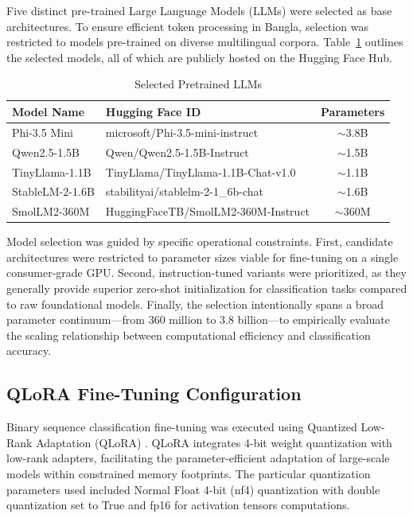 \documentclass[journal]{IEEEtran}
\begin{document}
Five distinct pre-trained Large Language Models (LLMs) were selected as base architectures. To ensure efficient token processing in Bangla, selection was restricted to models pre-trained on diverse multilingual corpora. Table~\ref{tab:models} outlines the selected models, all of which are publicly hosted on the Hugging Face Hub.

\begin{table}[htbp]
\caption{Selected Pretrained LLMs}
\label{tab:models}
\centering
\begin{tabular}{llc}
\toprule
\textbf{Model Name} & \textbf{Hugging Face ID} & \textbf{Parameters} \\
\midrule
Phi-3.5 Mini & microsoft/Phi-3.5-mini-instruct & $\sim$3.8B \\
Qwen2.5-1.5B & Qwen/Qwen2.5-1.5B-Instruct & $\sim$1.5B \\
TinyLlama-1.1B & TinyLlama/TinyLlama-1.1B-Chat-v1.0 & $\sim$1.1B \\
StableLM-2-1.6B & stabilityai/stablelm-2-1\_6b-chat & $\sim$1.6B \\
SmolLM2-360M & HuggingFaceTB/SmolLM2-360M-Instruct & $\sim$360M \\
\bottomrule
\end{tabular}
\end{table}

Model selection was guided by specific operational constraints. First, candidate architectures were restricted to parameter sizes viable for fine-tuning on a single consumer-grade GPU. Second, instruction-tuned variants were prioritized, as they generally provide superior zero-shot initialization for classification tasks compared to raw foundational models. Finally, the selection intentionally spans a broad parameter continuum---from 360 million to 3.8 billion---to empirically evaluate the scaling relationship between computational efficiency and classification accuracy.

\subsection{QLoRA Fine-Tuning Configuration}

Binary sequence classification fine-tuning was executed using Quantized Low-Rank Adaptation (QLoRA) \cite{ref11}. QLoRA integrates 4-bit weight quantization with low-rank adapters, facilitating the parameter-efficient adaptation of large-scale models within constrained memory footprints. The
particular quantization parameters used included Normal Float 4-bit
(nf4) quantization with double quantization set to True and fp16 for
activation tensors computations.
\end{document}
